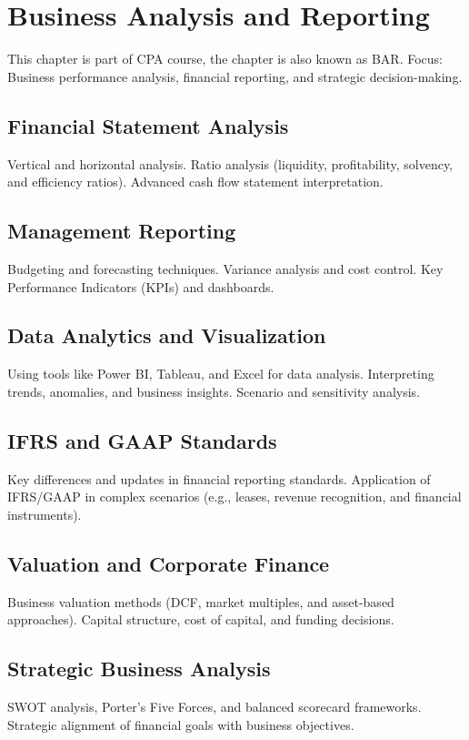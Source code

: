 \chapter{Business Analysis and Reporting}
This chapter is part of CPA course, the chapter is also known as BAR.
Focus: Business performance analysis, financial reporting, and strategic decision-making.

\section{Financial Statement Analysis}
Vertical and horizontal analysis.
Ratio analysis (liquidity, profitability, solvency, and efficiency ratios).
Advanced cash flow statement interpretation.

\section{Management Reporting}
Budgeting and forecasting techniques.
Variance analysis and cost control.
Key Performance Indicators (KPIs) and dashboards.

\section{Data Analytics and Visualization}
Using tools like Power BI, Tableau, and Excel for data analysis.
Interpreting trends, anomalies, and business insights.
Scenario and sensitivity analysis.

\section{IFRS and GAAP Standards}
Key differences and updates in financial reporting standards.
Application of IFRS/GAAP in complex scenarios (e.g., leases, revenue recognition, and financial instruments).

\section{Valuation and Corporate Finance}
Business valuation methods (DCF, market multiples, and asset-based approaches).
Capital structure, cost of capital, and funding decisions.

\section{Strategic Business Analysis}
SWOT analysis, Porter's Five Forces, and balanced scorecard frameworks.
Strategic alignment of financial goals with business objectives.